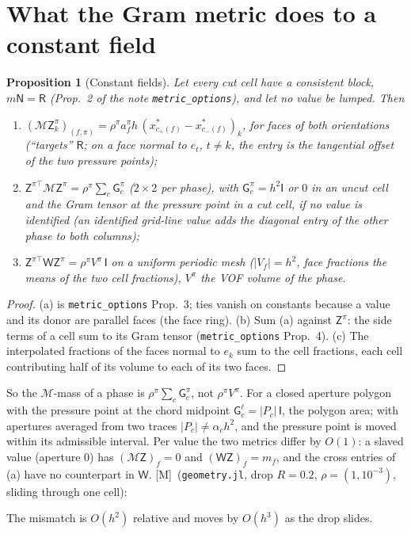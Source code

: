 \documentclass[11pt,a4paper]{article}
\newtheorem{proposition}{Proposition}
\newcommand{\meas}{\textsf{[M]}}
\newcommand{\code}[1]{\texttt{#1}}
\newcommand{\liq}{\ell}
\newcommand{\MM}{\mathcal M}
\newcommand{\W}{\mathsf W}
\newcommand{\Z}{\mathsf Z}
\newcommand{\R}{\mathsf R}
\newcommand{\G}{\mathsf G}
\begin{document}
\section{What the Gram metric does to a constant field}\label{sec:constant}
\begin{proposition}[Constant fields]\label{prop:constant}
Let every cut cell have a consistent block, $m\mathsf N=\R$ (Prop.~2 of the note
\code{metric\_options}), and let no value be lumped.  Then
\begin{enumerate}[leftmargin=*,itemsep=1pt,label=(\alph*)]
\item $(\MM\Z^\pi_k)_{(f,\pi)}=\rho^\pi a^\pi_f h\,(x^*_{c_+(f)}-x^*_{c_-(f)})_k$, for faces of
  both orientations (``targets'' $\R$; on a face normal to $e_t$, $t\ne k$, the entry is the
  tangential offset of the two pressure points);
\item $\Z^{\pi\top}\MM\Z^\pi=\rho^\pi\sum_c\G^\pi_c$ ($2\times2$ per phase), with $\G^\pi_c=h^2\mathsf I$
  or $0$ in an uncut cell and the Gram tensor at the pressure point in a cut cell, if no
  value is identified (an identified grid-line value adds the diagonal entry of the other
  phase to both columns);
\item $\Z^{\pi\top}\W\Z^\pi=\rho^\pi V^\pi\,\mathsf I$ on a uniform periodic mesh ($|V_f|=h^2$,
  face fractions the means of the two cell fractions), $V^\pi$ the VOF volume of the phase.
\end{enumerate}
\end{proposition}
\begin{proof}
(a) is \code{metric\_options} Prop.~3; ties vanish on constants because a value and its
donor are parallel faces (the face ring).  (b) Sum (a) against $\Z^\pi$: the side terms of
a cell sum to its Gram tensor (\code{metric\_options} Prop.~4).  (c) The interpolated
fractions of the faces normal to $e_k$ sum to the cell fractions, each cell contributing
half of its volume to each of its two faces.
\end{proof}
So the $\MM$-mass of a phase is $\rho^\pi\sum_c\G^\pi_c$, not $\rho^\pi V^\pi$.  For a
closed aperture polygon with the pressure point at the chord midpoint
$\G^\liq_c=|P_c|\,\mathsf I$, the polygon area; with apertures averaged from two traces
$|P_c|\neq\alpha_ch^2$, and the pressure point is moved within its admissible interval.
Per value the two metrics differ by $O(1)$: a slaved value (aperture $0$) has
$(\MM\Z)_f=0$ and $(\W\Z)_f=m_f$, and the cross entries of (a) have no counterpart in $\W$.
\meas\ (\code{geometry.jl}, drop $R=0.2$, $\rho=(1,10^{-3})$, sliding through one cell):

The mismatch is $O(h^2)$ relative and moves by $O(h^3)$ as the drop slides.
\end{document}
